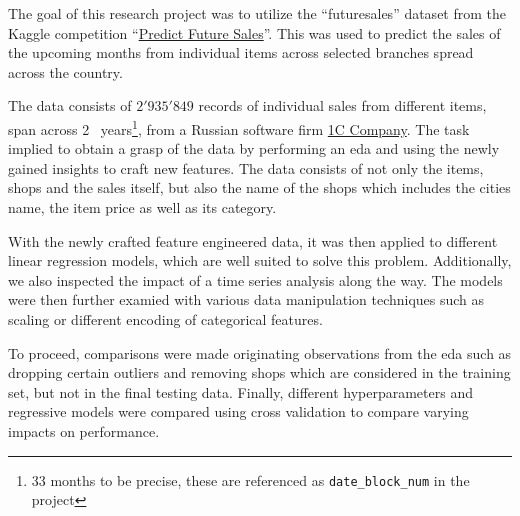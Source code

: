 The goal of this research project was to utilize the \enquote{\gls{futuresales}} dataset from the Kaggle competition \enquote{\href{https://www.kaggle.com/c/competitive-data-science-predict-future-sales}{Predict Future Sales}}.
This was used to predict the sales of the upcoming months from individual items across selected branches spread across the country.

The data consists of $2'935'849$ records of individual sales from different items, span across 2 \textonehalf \ years\footnote{33 months to be precise, these are referenced as \texttt{date\_block\_num} in the project}, from a Russian software firm \href{https://1c.ru/eng/title.htm}{1C Company}.
The task implied to obtain a grasp of the data by performing an \acrfull{eda} and using the newly gained insights to craft new features.
The data consists of not only the items, shops and the sales itself, but also the name of the shops which includes the cities name, the item price as well as its category.

With the newly crafted feature engineered data, it was then applied to different linear regression models, which are well suited to solve this problem.
Additionally, we also inspected the impact of a time series analysis along the way.
The models were then further examied with various data manipulation techniques such as scaling or different encoding of categorical features.

To proceed, comparisons were made originating observations from the \acrshort{eda} such as dropping certain outliers and removing shops which are considered in the training set, but not in the final testing data.
Finally, different \glspl{hyperparameter} and regressive models were compared using cross validation to compare varying impacts on performance.
